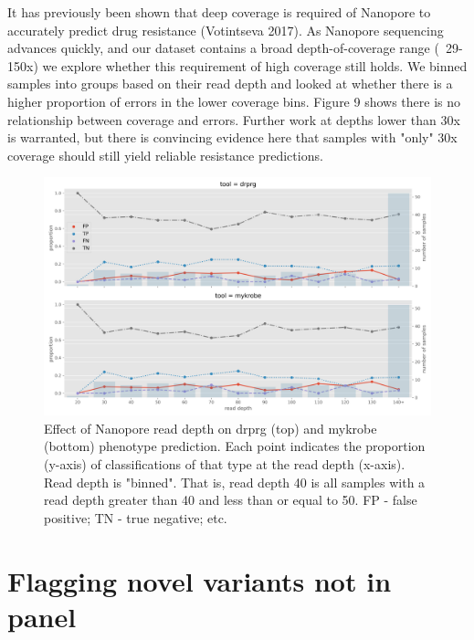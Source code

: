 It has previously been shown that deep coverage is required of Nanopore to accurately predict drug resistance (Votintseva 2017). As Nanopore sequencing advances quickly, and our dataset contains a broad depth-of-coverage range (~29-150x) we explore whether this requirement of high coverage still holds.
We binned samples into groups based on their read depth and looked at whether there is a higher proportion of errors in the lower coverage bins. Figure 9 shows there is no relationship between coverage and errors. Further work at depths lower than 30x is warranted, but there is convincing evidence here that samples with "only" 30x coverage should still yield reliable resistance predictions. 

\begin{figure}
\begin{center}
\includegraphics[width=0.90\columnwidth]{Chapter3/Figs/phenotype_coverage.png}
\caption{{Effect of Nanopore read depth on drprg (top) and mykrobe (bottom) phenotype prediction. Each point indicates the proportion (y-axis) of classifications of that type at the read depth (x-axis). Read depth is "binned". That is, read depth 40 is all samples with a read depth greater than 40 and less than or equal to 50. FP - false positive; TN - true negative; etc.
{\label{fig:pheno-covg}}
}}
\end{center}
\end{figure}
\section{Flagging novel variants not in panel}
\label{sec:drprg-discover}

